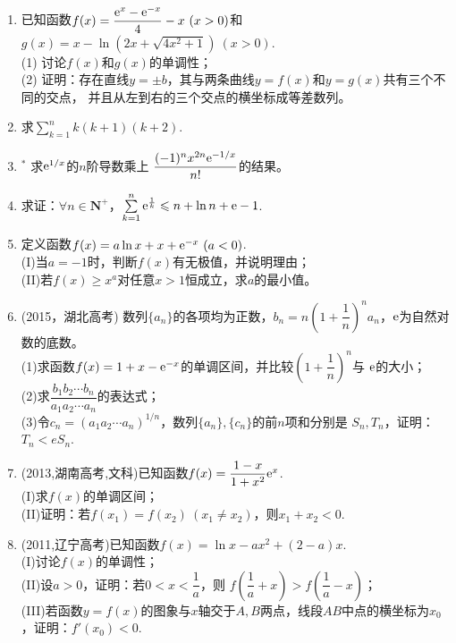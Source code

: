 \begin{enumerate}[label={\textbf{\arabic*.}},leftmargin=
    \inteval{\myenumleftmargin}pt]
\item 已知函数$f(x)=\dfrac{\mathrm{e}^x-\mathrm{e}^{-x}}{4}-x\ (x>0) $和
$ g(x)=x-\ln(2x+\sqrt{4x^2+1})\ (x>0) $. \\
(1) 讨论$ f(x) $和$ g(x) $的单调性；\\
(2) 证明：存在直线$y=\pm b$，其与两条曲线$y=f(x)$和$y=g(x)$共有三个不同的交点，
并且从左到右的三个交点的横坐标成等差数列。

\item 求$ \sum\limits_{k=1}^n k(k+1)(k+2) $.

\item $ ^* $ 求$ \mathrm{e}^{1/x} $的$ n $阶导数乘上
$ \dfrac{(-1)^nx^{2n}\mathrm{e}^{-1/x}}{n!} $的结果。

\item 求证：$ \forall n\in \textbf{N}^+ $，$ \sum\limits_{k=1}^{n} 
\mathrm{e}^{\frac{1}{k}}\leqslant n+\ln n+\mathrm{e} -1 $. 

\item 定义函数$ f(x)=a\ln x+x+\e^{-x} \ (a<0) $. \\
(I)当$ a=-1 $时，判断$ f(x) $有无极值，并说明理由；\\
(II)若$ f(x)\geq x^a $对任意$ x>1 $恒成立，求$ a $的最小值。

\item (2015，湖北高考) 数列$ \{a_n\} $的各项均为正数，$ b_n=n\left(1+\dfrac{1}{n}\right)^na_n $，$ \mathrm{e} $为自然对数的底数。\\
(1)求函数$ f(x)=1+x-\mathrm{e}^{-x} $的单调区间，并比较$ \left(1+\dfrac{1}{n}\right)^n $与
$ \mathrm{e} $的大小；\\
(2)求$ \dfrac{b_1b_2\cdots b_n}{a_1a_2\cdots a_n} $的表达式；\\
(3)令$ c_n=(a_1a_2\cdots a_n)^{1/n} $，数列$ \{a_n\},\{c_n\} $的前$ n $项和分别是
$ S_n,T_n $，证明：$ T_n<eS_n $.

\item (2013,湖南高考,文科)已知函数$ f(x)=\dfrac{1-x}{1+x^2}\mathrm{e}^x $.\\
(I)求$ f(x) $的单调区间；\\
(II)证明：若$ f(x_1)=f(x_2)\ (x_1\neq x_2) $，则$ x_1+x_2<0 $. 

\item (2011,辽宁高考)已知函数$ f(x)=\ln x-ax^2+(2-a)x $.\\
(I)讨论$ f(x) $的单调性；\\
(II)设$ a>0 $，证明：若$ 0<x<\dfrac{1}{a} $，则
$ f\left(\dfrac{1}{a}+x\right)>f\left(\dfrac{1}{a}-x\right) $；\\
(III)若函数$ y=f(x) $的图象与$ x $轴交于$ A,B $两点，线段$ AB $中点的横坐标为$ x_0 $，证明：$ f'(x_0)<0 $. 


\end{enumerate}
